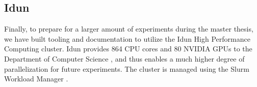 \subsection{Idun}

Finally,
to prepare for a larger amount of experiments during the master thesis,
we have built tooling and documentation to utilize the Idun High Performance Computing cluster.
Idun provides 864 CPU cores and 80 NVIDIA GPUs to the Department of Computer Science \cite{idun:overview},
and thus enables a much higher degree of parallelization for future experiments.
The cluster is managed using the Slurm Workload Manager \cite{slurm}.
